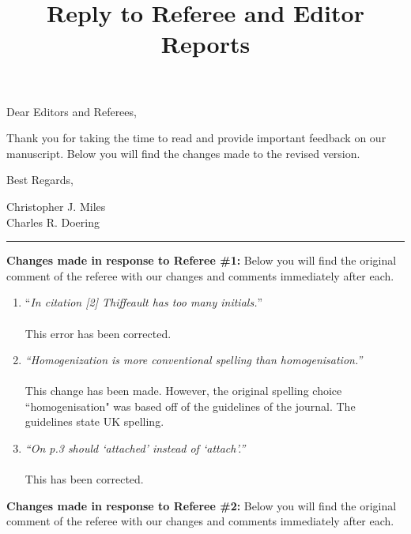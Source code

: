 \documentclass[]{article}
\title{Reply to Referee and Editor Reports}
\date{}
\begin{document}

\begin{flushleft}
Dear Editors and Referees,
\end{flushleft}

Thank you for taking the time to read and provide important feedback on our manuscript. Below you will find the changes made to the revised version. 

\begin{flushleft}
Best Regards, 
\end{flushleft}

\begin{flushleft}
Christopher J. Miles \\
Charles R. Doering
\end{flushleft}

\vspace{1cm}

\noindent\rule{\textwidth}{1pt}

\vspace{1cm}

{\bf Changes made in response to Referee \#1:} Below you will find the original comment of the referee with our changes and comments immediately after each.
\begin{enumerate}
\item  ``{\it In citation [2] Thiffeault has too many initials.}'' \\
\\
This error has been corrected.

\item {\it ``Homogenization is more conventional spelling than homogenisation.''}\\
\\
This change has been made. However, the original spelling choice ``homogenisation" was based off of the guidelines of the journal. The guidelines state UK spelling.  

\item  {\it ``On p.3 should `attached' instead of `attach'.''} \\
\\
This has been corrected.

\end{enumerate}

{\bf Changes made in response to Referee \#2:} Below you will find the original comment of the referee with our changes and comments immediately after each.
\end{document}
